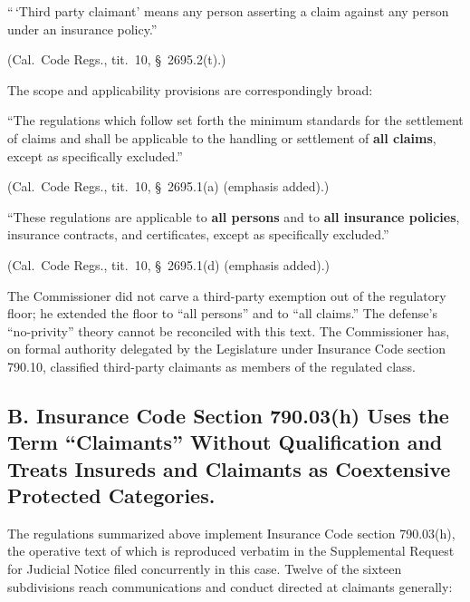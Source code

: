 \begin{quoting}
``\,`Third party claimant' means any person asserting a claim against any person under an insurance policy.''
\end{quoting}
\begin{flushright}
\small (Cal.\ Code Regs., tit.\ 10, \S~2695.2(t).)
\end{flushright}

\noindent The scope and applicability provisions are correspondingly broad:

\begin{quoting}
``The regulations which follow set forth the minimum standards for the settlement of claims and shall be applicable to the handling or settlement of \textbf{all claims}, except as specifically excluded.''
\end{quoting}
\begin{flushright}
\small (Cal.\ Code Regs., tit.\ 10, \S~2695.1(a) (emphasis added).)
\end{flushright}

\begin{quoting}
``These regulations are applicable to \textbf{all persons} and to \textbf{all insurance policies}, insurance contracts, and certificates, except as specifically excluded.''
\end{quoting}
\begin{flushright}
\small (Cal.\ Code Regs., tit.\ 10, \S~2695.1(d) (emphasis added).)
\end{flushright}

The Commissioner did not carve a third-party exemption out of the regulatory floor; he extended the floor to ``all persons'' and to ``all claims.'' The defense's ``no-privity'' theory cannot be reconciled with this text. The Commissioner has, on formal authority delegated by the Legislature under Insurance Code section 790.10, classified third-party claimants as members of the regulated class.

\subsection*{B. Insurance Code Section 790.03(h) Uses the Term ``Claimants'' Without Qualification and Treats Insureds and Claimants as Coextensive Protected Categories.}

The regulations summarized above implement Insurance Code section 790.03(h), the operative text of which is reproduced verbatim in the Supplemental Request for Judicial Notice filed concurrently in this case. Twelve of the sixteen subdivisions reach communications and conduct directed at claimants generally:


